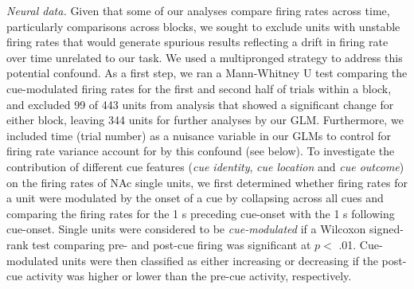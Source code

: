\documentclass[11pt]{article}
\begin{document}
{\it Neural data.} Given that some of our analyses compare firing rates across time,
particularly comparisons across blocks, we sought to exclude units
with unstable firing rates that would generate spurious results
reflecting a drift in firing rate over time unrelated to our task. We used a multipronged strategy to address this potential confound. As a first step, we ran a Mann-Whitney U test comparing the cue-modulated firing
rates for the first and second half of trials within a block, and
excluded 99 of 443 units from analysis that showed a significant change for
either block, leaving 344 units for further analyses by our GLM. Furthermore, we included time (trial number) as a nuisance variable in our GLMs to control for firing rate variance account for by this confound (see below). To investigate the contribution of different cue
features ({\it cue identity}, {\it cue location} and {\it cue outcome}) on the firing rates of NAc
single units, we first determined whether firing rates for a unit
were modulated by the onset of a cue by collapsing across all cues
and comparing the firing rates for the 1 s preceding cue-onset with
the 1 s following cue-onset. Single units were considered to be {\it
cue-modulated} if a Wilcoxon signed-rank test comparing pre- and
post-cue firing was significant at $p <$ .01. Cue-modulated units
were then classified as either increasing or decreasing if the
post-cue activity was higher or lower than the pre-cue activity,
respectively.
\end{document}
